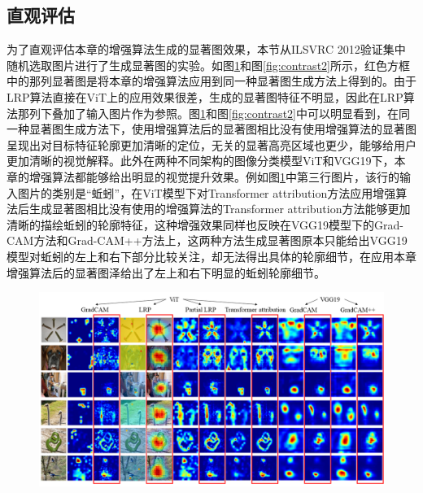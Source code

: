 \subsection{直观评估}
为了直观评估本章的增强算法生成的显著图效果，本节从ILSVRC 2012验证集中随机选取图片进行了生成显著图的实验。如图\ref{fig:contrast1}和图\ref{fig:contrast2}所示，红色方框中的那列显著图是将本章的增强算法应用到同一种显著图生成方法上得到的。由于LRP算法直接在ViT上的应用效果很差，生成的显著图特征不明显，因此在LRP算法那列下叠加了输入图片作为参照。图\ref{fig:contrast1}和图\ref{fig:contrast2}中可以明显看到，在同一种显著图生成方法下，使用增强算法后的显著图相比没有使用增强算法的显著图呈现出对目标特征轮廓更加清晰的定位，无关的显著高亮区域也更少，能够给用户更加清晰的视觉解释。此外在两种不同架构的图像分类模型ViT和VGG19下，本章的增强算法都能够给出明显的视觉提升效果。例如图\ref{fig:contrast1}中第三行图片，该行的输入图片的类别是“蚯蚓”，在ViT模型下对Transformer attribution方法应用增强算法后生成显著图相比没有使用的增强算法的Transformer attribution方法能够更加清晰的描绘蚯蚓的轮廓特征，这种增强效果同样也反映在VGG19模型下的Grad-CAM方法和Grad-CAM++方法上，这两种方法生成显著图原本只能给出VGG19模型对蚯蚓的左上和右下部分比较关注，却无法得出具体的轮廓细节，在应用本章增强算法后的显著图泽给出了左上和右下明显的蚯蚓轮廓细节。

\begin{figure}[h]
	\centering 
	\includegraphics[width=15cm]{fig/ch4/Contrast.png}
	\label{fig:contrast1}
\end{figure}

